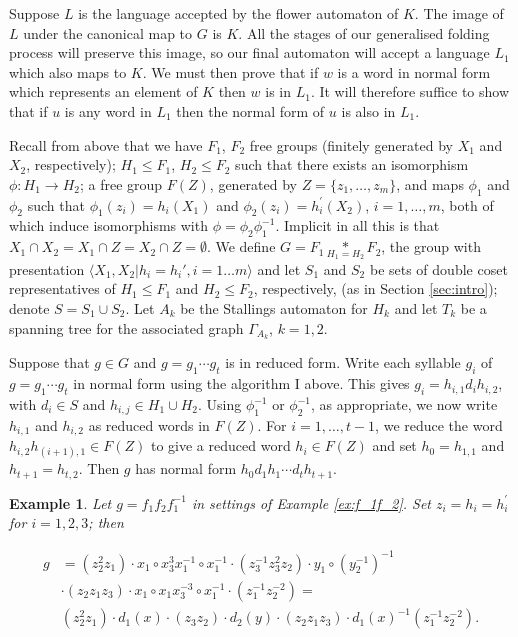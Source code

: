 \documentclass[a4paper,12pt]{article}
\newcommand{\G}{\Gamma }
\newcommand{\nul}{\emptyset }
\newtheorem{exam}[theorem]{Example}
\newenvironment{example}{\begin{exam} \rm}{\end{exam}}
\numberwithin{equation}{section}
\numberwithin{figure}{section}
\newcommand{\la}{\langle}
\newcommand{\ra}{\rangle}
\begin{document}
 Suppose $L$ is the
language accepted by the flower automaton of $K$. The image of $L$ under
the canonical map to $G$ is $K$. All the stages of our generalised folding
process will preserve this image, so our final automaton will accept a language
$L_1$ which also maps to $K$. We must then prove that if $w$ is a word
in normal form which represents an element of $K$ then $w$ is in $L_1$. It will
therefore suffice to show that if $u$ is any word in $L_1$ then the
normal form of $u$ is also in $L_1$.

Recall from above that we have $F_1$, $F_2$ free groups (finitely
generated by $X_1$ and $X_2$, respectively);
 $H_1 \leq F_1$, $H_2 \leq F_2$ such that
there exists an isomorphism $\phi: H_1 \rightarrow H_2$; a free group
 $F(Z)$, generated by $Z=\{z_1, \ldots, z_m\}$,
and  maps $\phi_1$ and $\phi_2$ such that $\phi_1(z_i)=h_i(X_1)  $
and  $\phi_2(z_i)=h^\prime_i(X_2)$, $i=1,\ldots ,m$, both of which
induce isomorphisms with $\phi=\phi_2\phi_1^{-1}$. Implicit in all
this is that $X_1\cap X_2=X_1\cap Z = X_2\cap Z=\nul$. We define
${G = F_1 \underset{H_1=H_2}{\ast} F_2}$, the group with
 presentation $\la X_1,X_2 | h_i = h_i', i=1 \ldots m\ra$ and
let $S_1$ and $S_2$ be sets of  double coset representatives of
$H_1\le F_1$ and $H_2\le F_2$, respectively, (as in Section
\ref{sec:intro}); denote $S= S_1 \cup S_2$. Let $A_k$ be the
Stallings automaton for $H_k$ and let $T_k$ be a spanning tree for
the associated graph $\G_{A_k}$, $k=1,2$.

Suppose that $g \in G$ and $g=g_1\cdots g_t$ is in reduced form.
Write each syllable $g_i$ of $g=g_1\cdots g_t$ in normal form
using the algorithm I above. This gives
$g_i=h_{i,1}d_ih_{i,2}$, with $d_i\in S$ and $h_{i,j}\in H_1\cup
H_2$. Using $\phi_1^{-1}$ or $\phi_2^{-1}$, as appropriate, we now
write $h_{i,1}$ and $h_{i,2}$ as reduced words in $F(Z)$. For
$i=1,\ldots , t-1$, we reduce the word $h_{i,2}h_{(i+1),1}\in
F(Z)$ to give a reduced word $h_i\in F(Z)$ and set $h_0=h_{1,1}$
and  $h_{t+1}=h_{t,2}$. Then $g$ has normal form $h_0d_1h_1\cdots
d_th_{t+1}$.


\begin{example}\label{ex:g}
Let $g =f_1 f_2 f_1^{-1}$ in settings of Example \ref{ex:f_1f_2}.
Set $z_i = h_i = h_i^{\prime}$ for $i= 1,2,3$; then

\begin{align*}
g &= (z_2^2z_1)\cdot x_1 \circ x_3^3x_1^{-1} \circ x_1^{-1}\cdot
(z_3^{-1}z_3^2z_2) \cdot y_1 \circ (y_2^{-1})^{-1}\\ &\cdot(z_2 z_1 z_3)\cdot x_1\circ x_1 x_3^{-3} \circ x_1^{-1}\cdot (z_1^{-1}z_2^{-2})=\\
&(z_2^2z_1)\cdot d_1(x) \cdot (z_3z_2) \cdot d_2(y) \cdot(z_2 z_1
z_3) \cdot d_1(x)^{-1} (z_1^{-1}z_2^{-2}).
\end{align*}

\end{example}
\end{document}
